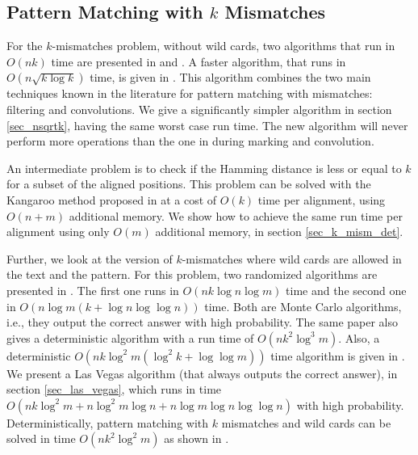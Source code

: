 \subsection{Pattern Matching with $k$ Mismatches}

For the $k$-mismatches problem, without wild cards, two algorithms that
run in $O(nk)$ time are presented in \cite{LV85} and \cite{GG86}. A faster
algorithm, that runs in $O(n\sqrt{k \log k})$ time, is given in
\cite{ALP04}. This algorithm combines the two
main techniques known in the literature for pattern matching with mismatches: filtering and convolutions. 
We give a significantly simpler algorithm in section \ref{sec_nsqrtk}, having
the same worst case run time. The new algorithm will never perform more
operations than the one in \cite{ALP04} during marking and convolution. 
 
An intermediate problem is to check if the
Hamming distance is less or equal to $k$ for a subset of the aligned positions.
This problem can be solved with the Kangaroo method proposed in \cite{GG86} at a
cost of $O(k)$ time per alignment, using $O(n+m)$ additional memory. We show how to achieve the same
run time per alignment using only $O(m)$ additional memory, in section
\ref{sec_k_mism_det}.

Further, we look at the version of $k$-mismatches where wild cards are allowed
in the text and the pattern. For this problem, two randomized algorithms are
presented in \cite{CEP+07}. The first one runs in $O(nk\log n\log m)$  time and
the second one in $O\left (n\log m(k+\log n\log\log n)\right )$ time.
Both are Monte Carlo algorithms, i.e., they output the correct
answer with high probability. The same paper also gives a deterministic
algorithm with a run time of $O(nk^2\log^3m)$. Also, a deterministic $O(nk
\log^2 m(\log^2 k + \log \log m))$ time algorithm is given in \cite{CEPR09}. We present a
Las Vegas algorithm (that always outputs the correct answer), in section
\ref{sec_las_vegas}, which runs in time $O(nk\log^2 m+n\log^2m\log n+n\log
m\log n\log\log n)$ with high probability. Deterministically, pattern matching
with $k$ mismatches and wild cards can be solved in time $O(nk^2\log^2m)$ as shown in
\cite{Clif10}.

